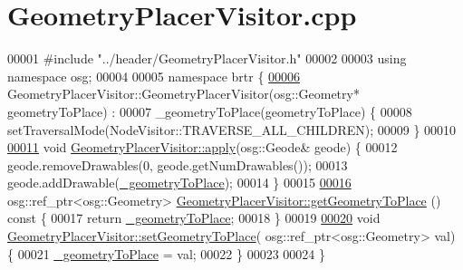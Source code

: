 \hypertarget{_geometry_placer_visitor_8cpp_source}{\section{Geometry\+Placer\+Visitor.\+cpp}
\label{_geometry_placer_visitor_8cpp_source}
}

\begin{DoxyCode}
00001 \textcolor{preprocessor}{#include "../header/GeometryPlacerVisitor.h"}
00002 
00003 \textcolor{keyword}{using namespace }osg;
00004 
00005 \textcolor{keyword}{namespace }brtr \{
\hypertarget{_geometry_placer_visitor_8cpp_source_l00006}{}\hyperlink{classbrtr_1_1_geometry_placer_visitor_a5e6ca74eba57f86c0916434cb38eb7fc}{00006}     GeometryPlacerVisitor::GeometryPlacerVisitor(osg::Geometry* geometryToPlace) :
00007         \_geometryToPlace(geometryToPlace) \{
00008         setTraversalMode(NodeVisitor::TRAVERSE\_ALL\_CHILDREN);
00009     \}
00010 
\hypertarget{_geometry_placer_visitor_8cpp_source_l00011}{}\hyperlink{classbrtr_1_1_geometry_placer_visitor_a26089587464d88953e38926162cb1c6e}{00011}     \textcolor{keywordtype}{void} \hyperlink{classbrtr_1_1_geometry_placer_visitor_a26089587464d88953e38926162cb1c6e}{GeometryPlacerVisitor::apply}(osg::Geode& geode) \{
00012         geode.removeDrawables(0, geode.getNumDrawables());
00013         geode.addDrawable(\hyperlink{classbrtr_1_1_geometry_placer_visitor_a171826d64ddd04161d7525bc60faf045}{\_geometryToPlace});
00014     \}
00015 
\hypertarget{_geometry_placer_visitor_8cpp_source_l00016}{}\hyperlink{classbrtr_1_1_geometry_placer_visitor_ad784364cfe34434dc2183a5ead95db40}{00016}     osg::ref\_ptr<osg::Geometry> \hyperlink{classbrtr_1_1_geometry_placer_visitor_ad784364cfe34434dc2183a5ead95db40}{GeometryPlacerVisitor::getGeometryToPlace}
      ()\textcolor{keyword}{ const }\{
00017         \textcolor{keywordflow}{return} \hyperlink{classbrtr_1_1_geometry_placer_visitor_a171826d64ddd04161d7525bc60faf045}{\_geometryToPlace};
00018     \}
00019 
\hypertarget{_geometry_placer_visitor_8cpp_source_l00020}{}\hyperlink{classbrtr_1_1_geometry_placer_visitor_a95e8e5c2df5b9a31949c55c796c90fd5}{00020}     \textcolor{keywordtype}{void} \hyperlink{classbrtr_1_1_geometry_placer_visitor_a95e8e5c2df5b9a31949c55c796c90fd5}{GeometryPlacerVisitor::setGeometryToPlace}(
      osg::ref\_ptr<osg::Geometry> val) \{
00021         \hyperlink{classbrtr_1_1_geometry_placer_visitor_a171826d64ddd04161d7525bc60faf045}{\_geometryToPlace} = val;
00022     \}
00023 
00024 \}
\end{DoxyCode}

